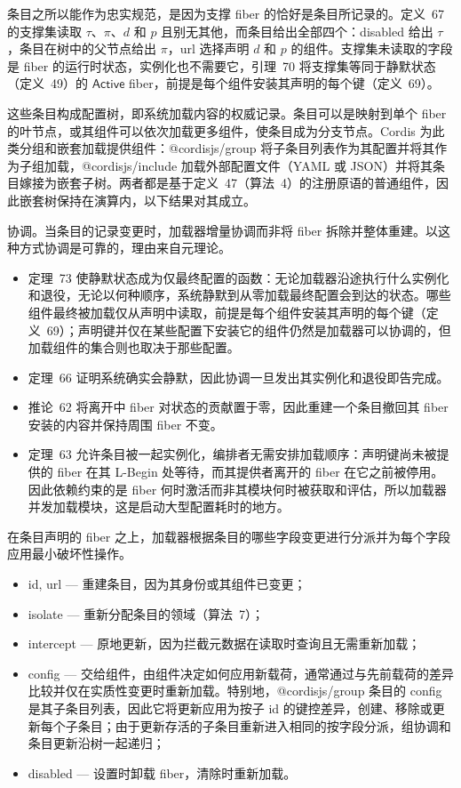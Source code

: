 条目之所以能作为忠实规范，是因为支撑 fiber 的恰好是条目所记录的。定义~67 的支撑集读取 $\tau$、$\pi$、$d$ 和 $p$ 且别无其他，而条目给出全部四个：disabled 给出 $\tau$，条目在树中的父节点给出 $\pi$，url 选择声明 $d$ 和 $p$ 的组件。支撑集未读取的字段是 fiber 的运行时状态，实例化也不需要它，引理~70 将支撑集等同于静默状态（定义~49）的 $\mathsf{Active}$ fiber，前提是每个组件安装其声明的每个键（定义~69）。

这些条目构成配置树，即系统加载内容的权威记录。条目可以是映射到单个 fiber 的叶节点，或其组件可以依次加载更多组件，使条目成为分支节点。Cordis 为此类分组和嵌套加载提供组件：@cordisjs/group 将子条目列表作为其配置并将其作为子组加载，@cordisjs/include 加载外部配置文件（YAML 或 JSON）并将其条目嫁接为嵌套子树。两者都是基于定义~47（算法~4）的注册原语的普通组件，因此嵌套树保持在演算内，以下结果对其成立。

协调。当条目的记录变更时，加载器增量协调而非将 fiber 拆除并整体重建。以这种方式协调是可靠的，理由来自元理论。
\begin{itemize}
\item 定理~73 使静默状态成为仅最终配置的函数：无论加载器沿途执行什么实例化和退役，无论以何种顺序，系统静默到从零加载最终配置会到达的状态。哪些组件最终被加载仅从声明中读取，前提是每个组件安装其声明的每个键（定义~69）；声明键并仅在某些配置下安装它的组件仍然是加载器可以协调的，但加载组件的集合则也取决于那些配置。
\item 定理~66 证明系统确实会静默，因此协调一旦发出其实例化和退役即告完成。
\item 推论~62 将离开中 fiber 对状态的贡献置于零，因此重建一个条目撤回其 fiber 安装的内容并保持周围 fiber 不变。
\item 定理~63 允许条目被一起实例化，编排者无需安排加载顺序：声明键尚未被提供的 fiber 在其 L-Begin 处等待，而其提供者离开的 fiber 在它之前被停用。因此依赖约束的是 fiber 何时激活而非其模块何时被获取和评估，所以加载器并发加载模块，这是启动大型配置耗时的地方。
\end{itemize}

在条目声明的 fiber 之上，加载器根据条目的哪些字段变更进行分派并为每个字段应用最小破坏性操作。
\begin{itemize}
\item id, url — 重建条目，因为其身份或其组件已变更；
\item isolate — 重新分配条目的领域（算法~7）；
\item intercept — 原地更新，因为拦截元数据在读取时查询且无需重新加载；
\item config — 交给组件，由组件决定如何应用新载荷，通常通过与先前载荷的差异比较并仅在实质性变更时重新加载。特别地，@cordisjs/group 条目的 config 是其子条目列表，因此它将更新应用为按子 id 的键控差异，创建、移除或更新每个子条目；由于更新存活的子条目重新进入相同的按字段分派，组协调和条目更新沿树一起递归；
\item disabled — 设置时卸载 fiber，清除时重新加载。
\end{itemize}

